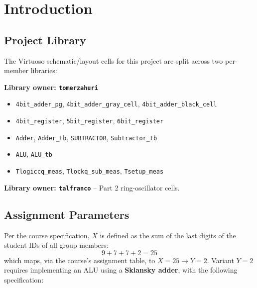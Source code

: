 \documentclass[11pt, a4paper]{article}
\newcommand{\sig}[1]{\texttt{#1}}
\begin{document}
\clearpage
\tableofcontents
\clearpage

\section{Introduction}

\subsection{Project Library}
The Virtuoso schematic/layout cells for this project are split across two
per-member libraries:

\smallskip
\noindent\textbf{Library owner: \sig{tomerzahuri}}
\begin{itemize}
  \item \sig{4bit\_adder\_pg}, \sig{4bit\_adder\_gray\_cell}, \sig{4bit\_adder\_black\_cell}
  \item \sig{4bit\_register}, \sig{5bit\_register}, \sig{6bit\_register}
  \item \sig{Adder}, \sig{Adder\_tb}, \sig{SUBTRACTOR}, \sig{Subtractor\_tb}
  \item \sig{ALU}, \sig{ALU\_tb}
  \item \sig{Tlogiccq\_meas}, \sig{Tlockq\_sub\_meas}, \sig{Tsetup\_meas}
\end{itemize}

\noindent\textbf{Library owner: \sig{talfranco}} -- Part 2 ring-oscillator cells.

\subsection{Assignment Parameters}
Per the course specification, $X$ is defined as the sum of the last digits
of the student IDs of all group members:
\[
9 + 7 + 7 + 2 = 25
\]
which maps, via the course's assignment table, to $X = 25 \rightarrow Y = 2$.
Variant $Y = 2$ requires implementing an ALU using a \textbf{Sklansky adder},
with the following specification:
\end{document}
